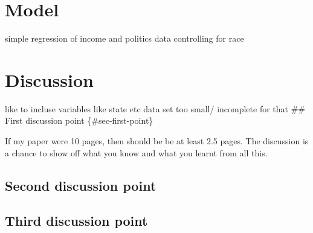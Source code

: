 \documentclass[
  letterpaper,
  DIV=11,
  numbers=noendperiod]{scrartcl}
\begin{document}
\begin{figure}


\caption{\label{fig-figure3}}

\end{figure}%

\section{Model}\label{model}

simple regression of income and politics data controlling for race

\section{Discussion}\label{discussion}

like to incluse variables like state etc data set too small/ incomplete
for that \#\# First discussion point \{\#sec-first-point\}

If my paper were 10 pages, then should be be at least 2.5 pages. The
discussion is a chance to show off what you know and what you learnt
from all this.

\subsection{Second discussion point}\label{second-discussion-point}

\subsection{Third discussion point}\label{third-discussion-point}
\end{document}
